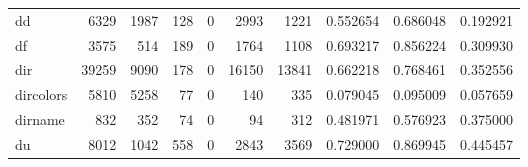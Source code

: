 \begin{longtable}{lrrrrrrrrr}
dd        &                                6329 &                                            1987 &                                            128 &                                             0 &                                           2993 &                                         1221 &                                           0.552654 &                               0.686048 &                             0.192921 \\
df        &                                3575 &                                             514 &                                            189 &                                             0 &                                           1764 &                                         1108 &                                           0.693217 &                               0.856224 &                             0.309930 \\
dir       &                               39259 &                                            9090 &                                            178 &                                             0 &                                          16150 &                                        13841 &                                           0.662218 &                               0.768461 &                             0.352556 \\
dircolors &                                5810 &                                            5258 &                                             77 &                                             0 &                                            140 &                                          335 &                                           0.079045 &                               0.095009 &                             0.057659 \\
dirname   &                                 832 &                                             352 &                                             74 &                                             0 &                                             94 &                                          312 &                                           0.481971 &                               0.576923 &                             0.375000 \\
du        &                                8012 &                                            1042 &                                            558 &                                             0 &                                           2843 &                                         3569 &                                           0.729000 &                               0.869945 &                             0.445457 \\

\end{longtable}
